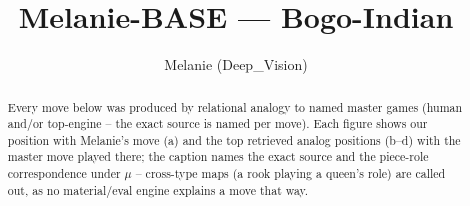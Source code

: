 \documentclass[11pt]{article}
\title{Melanie-BASE — Bogo-Indian}
\author{Melanie (Deep\_Vision)}
\date{}
\begin{document}
\maketitle

\begin{abstract}Every move below was produced by relational analogy to named master games (human and/or top-engine -- the exact source is named per move). Each figure shows our position with Melanie's move (a) and the top retrieved analog positions (b--d) with the master move played there; the caption names the exact source and the piece-role correspondence under $\mu$ -- cross-type maps (a rook playing a queen's role) are called out, as no material/eval engine explains a move that way.\end{abstract}

\begin{figure}[p]\centering
\begin{subfigure}{0.46\textwidth}\centering
\resizebox{\linewidth}{!}{%
\newchessgame
\chessboard[
  setfen={r1b1k2r/ppppqppp/2n1pn2/8/2PP4/2B2NP1/PP2PP1P/R2QKB1R b KQkq - 0 7},
  showmover=false,
  pgfstyle=straightmove, color=movearrow, markmove={e8-g8}
]}
\caption{}
\end{subfigure}\hfill
\begin{subfigure}{0.46\textwidth}\centering
\resizebox{\linewidth}{!}{%
\newchessgame
\chessboard[
  setfen={r1bqk2r/pp2ppbp/2n2np1/3p4/3P4/2N2NP1/PP2PPBP/R1BQK2R w KQkq - 2 8},
  showmover=false,
  pgfstyle=straightmove, color=movearrow, markmove={e1-g1}
]}
\caption{}
\end{subfigure}
\\[4pt]
\begin{subfigure}{0.46\textwidth}\centering
\resizebox{\linewidth}{!}{%
\newchessgame
\chessboard[
  setfen={r1bqk2r/p1pp1ppp/1pn2n2/4p3/2P1P3/P1N5/1P1P1PPP/R1BQKB1R b KQkq - 0 7},
  showmover=false,
  pgfstyle=straightmove, color=movearrow, markmove={e8-g8}
]}
\caption{}
\end{subfigure}\hfill
\begin{subfigure}{0.46\textwidth}\centering
\resizebox{\linewidth}{!}{%
\newchessgame
\chessboard[
  setfen={r1bqk2r/pppp1ppp/2n2n2/4p3/1PP5/P3P3/3P1PPP/R1BQKBNR b KQkq - 0 7},
  showmover=false,
  pgfstyle=straightmove, color=movearrow, markmove={e8-g8}
]}
\caption{}
\end{subfigure}

\end{figure}
\end{document}
